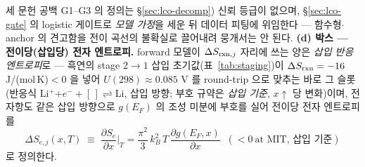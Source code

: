 세 문헌 공백 G1--G3 의 정의는 \S\ref{sec:lco-decomp}) 신뢰 등급이 없으며,
\S\ref{sec:lco-gate} 의 logistic 게이트로 \emph{모델 가정}을 세운 뒤 데이터 피팅에 위임한다 --- 함수형$\cdot$anchor
의 견고함을 전이 곡선의 불확실로 끌어내려 뭉개서는 안 된다. \textbf{(d) 박스 --- 전이당(삽입당) 전자 엔트로피.} forward 모델이 $\Delta S_{\mathrm{rxn},j}$ 자리에 쓰는 양은 \emph{삽입 반응 엔트로피}로 --- 흑연의
stage $2\!\to\!1$ 삽입 초기값(표~\ref{tab:staging})이 $\Delta S_{\mathrm{rxn}}=-16$ J/(mol\,K)$<0$
을 넣어 $U(298)\approx0.085$ V 를 round-trip 으로 맞추는 바로 그 슬롯(반응식
Li$^+$$+e^-+[\,]\rightleftharpoons$Li, 삽입 방향; 부호 규약은 \emph{삽입 기준}, $x\!\uparrow$ 당 변화)이며,
전자항도 같은 삽입 방향으로 $g(E_F)$ 의 조성 미분에 부호를 실어 전이당 전자 엔트로피를
\begin{equation}
\boxed{\;\Delta S_{e,j}(x,T)\;\equiv\;\frac{\partial S_e}{\partial x}\Big|_T
=\frac{\pi^2}{3}\,k_B^2\,T\,\frac{\partial g(E_F,x)}{\partial x}\;\;(<0\ \text{at MIT, 삽입 기준})\;}
\label{eq:dSe}
\end{equation}
로 정의한다.


